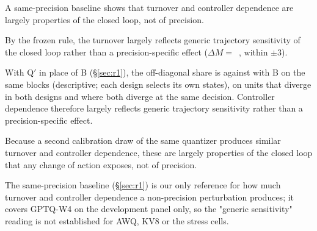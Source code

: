 A same-precision baseline shows that turnover and controller dependence are largely properties of the closed loop, not of precision.

By the frozen rule, the turnover largely reflects generic trajectory sensitivity of the closed loop rather than a precision-specific effect ($\Delta M=$~\pp{}, within $\pm3$\pp{}). %

With Q$'$ in place of B (\S\ref{sec:r1}), the off-diagonal share is  against  with B on the same blocks (descriptive; each design selects its own states),  on units that diverge in both designs and  where both diverge at the same decision. Controller dependence therefore largely reflects generic trajectory sensitivity rather than a precision-specific effect. %

Because a second calibration draw of the same quantizer produces similar turnover and controller dependence, these are largely properties of the closed loop that any change of action exposes, not of precision.

The same-precision baseline (\S\ref{sec:r1}) is our only reference for how much turnover and controller dependence a non-precision perturbation produces; it covers GPTQ-W4 on the development panel only, so the "generic sensitivity" reading is not established for AWQ, KV8 or the stress cells.

\fi
